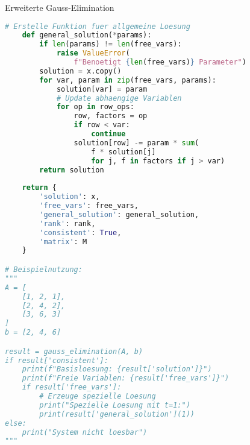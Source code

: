 \begin{examplecode}{Erweiterte Gauss-Elimination}
\begin{lstlisting}[language=Python, style=basesmol]
    # Erstelle Funktion fuer allgemeine Loesung
    def general_solution(*params):
        if len(params) != len(free_vars):
            raise ValueError(
                f"Benoetigt {len(free_vars)} Parameter")
        solution = x.copy()
        for var, param in zip(free_vars, params):
            solution[var] = param
            # Update abhaengige Variablen
            for op in row_ops:
                row, factors = op
                if row < var:
                    continue
                solution[row] -= param * sum(
                    f * solution[j] 
                    for j, f in factors if j > var)
        return solution
    
    return {
        'solution': x,
        'free_vars': free_vars,
        'general_solution': general_solution,
        'rank': rank,
        'consistent': True,
        'matrix': M
    }

# Beispielnutzung:
"""
A = [
    [1, 2, 1],
    [2, 4, 2],
    [3, 6, 3]
]
b = [2, 4, 6]

result = gauss_elimination(A, b)
if result['consistent']:
    print(f"Basisloesung: {result['solution']}")
    print(f"Freie Variablen: {result['free_vars']}")
    if result['free_vars']:
        # Erzeuge spezielle Loesung
        print("Spezielle Loesung mit t=1:")
        print(result['general_solution'](1))
else:
    print("System nicht loesbar")
"""
\end{lstlisting}
\end{examplecode}

